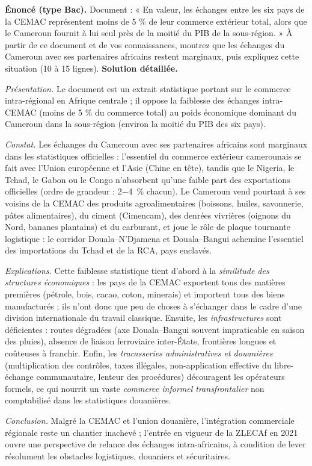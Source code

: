 \documentclass[11pt]{article}
\newcommand{\cle}[1]{{\popxbold\color{popdark}#1}}
\begin{document}
\begin{exoresolu}
\textbf{Énoncé (type Bac).} Document : « En valeur, les échanges entre les six pays de la CEMAC représentent moins de 5 \% de leur commerce extérieur total, alors que le Cameroun fournit à lui seul près de la moitié du PIB de la sous-région. » À partir de ce document et de vos connaissances, montrez que les échanges du Cameroun avec ses partenaires africains restent marginaux, puis expliquez cette situation (10 à 15 lignes).
\tcblower
\textbf{Solution détaillée.}

\emph{Présentation.} Le document est un extrait statistique portant sur le commerce intra-régional en Afrique centrale ; il oppose la faiblesse des échanges intra-CEMAC (moins de 5 \% du commerce total) au poids économique dominant du Cameroun dans la sous-région (environ la moitié du PIB des six pays).

\emph{Constat.} Les échanges du Cameroun avec ses partenaires africains sont marginaux dans les statistiques officielles : l'essentiel du commerce extérieur camerounais se fait avec l'Union européenne et l'Asie (Chine en tête), tandis que le Nigeria, le Tchad, le Gabon ou le Congo n'absorbent qu'une faible part des exportations officielles (ordre de grandeur : \SI{2-4}{\%} chacun). Le Cameroun vend pourtant à ses voisins de la CEMAC des produits agroalimentaires (boissons, huiles, savonnerie, pâtes alimentaires), du ciment (Cimencam), des denrées vivrières (oignons du Nord, bananes plantains) et du carburant, et joue le rôle de \cle{plaque tournante} logistique : le corridor Douala--N'Djamena et Douala--Bangui achemine l'essentiel des importations du Tchad et de la RCA, pays enclavés.

\emph{Explications.} Cette faiblesse statistique tient d'abord à la \emph{similitude des structures économiques} : les pays de la CEMAC exportent tous des matières premières (pétrole, bois, cacao, coton, minerais) et importent tous des biens manufacturés ; ils n'ont donc que peu de choses à s'échanger dans le cadre d'une division internationale du travail classique. Ensuite, les \emph{infrastructures} sont déficientes : routes dégradées (axe Douala--Bangui souvent impraticable en saison des pluies), absence de liaison ferroviaire inter-États, frontières longues et coûteuses à franchir. Enfin, les \emph{tracasseries administratives et douanières} (multiplication des contrôles, taxes illégales, non-application effective du libre-échange communautaire, lenteur des procédures) découragent les opérateurs formels, ce qui nourrit un vaste \emph{commerce informel transfrontalier} non comptabilisé dans les statistiques douanières.

\emph{Conclusion.} Malgré la CEMAC et l'union douanière, l'intégration commerciale régionale reste un chantier inachevé ; l'entrée en vigueur de la ZLECAf en 2021 ouvre une perspective de relance des échanges intra-africains, à condition de lever résolument les obstacles logistiques, douaniers et sécuritaires.
\end{exoresolu}
\end{document}
